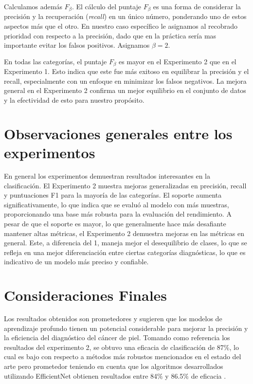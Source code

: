 Calculamos además $F_{\beta}$. El cálculo del puntaje $F_{\beta}$ es una forma de considerar la precisión y la recuperación (\textit{recall}) en un único número, ponderando uno de estos aspectos más que el otro. En nuestro caso específico le asignamos al recobrado prioridad con respecto a la precisión, dado que en la práctica sería mas importante evitar los falsos positivos. Asignamos $\beta = 2$.

En todas las categorías, el puntaje $F_{\beta}$ es mayor en el Experimento 2 que en el Experimento 1. Esto indica que este fue más exitoso en equilibrar la precisión y el recall, especialmente con un enfoque en minimizar los falsos negativos. La mejora general en el Experimento 2 confirma un mejor equilibrio en el conjunto de datos y la efectividad de esto para nuestro propósito.

\section*{Observaciones generales entre los experimentos}

En general los experimentos demuestran resultados interesantes en la clasificación. El Experimento 2 muestra mejoras generalizadas en precisión, recall y puntuaciones F1 para la mayoría de las categorías. El soporte aumenta significativamente, lo que indica que se evaluó al modelo con más muestras, proporcionando una base más robusta para la evaluación del rendimiento. A pesar de que el soporte es mayor, lo que generalmente hace más desafiante mantener altas métricas, el Experimento 2 demuestra mejoras en las métricas en general. Este, a diferencia del 1, maneja mejor el desequilibrio de clases, lo que se refleja en una mejor diferenciación entre ciertas categorías diagnósticas, lo que es indicativo de un modelo más preciso y confiable.

\section{Consideraciones Finales}\label{subsubsec:final_considerations}

Los resultados obtenidos son prometedores y sugieren que los modelos de aprendizaje profundo tienen un potencial considerable para mejorar la precisión y la eficiencia del diagnóstico del cáncer de piel. Tomando como referencia los resultados del experimento 2, se obtuvo una eficacia de clasificación de 87\%, lo cual es bajo con respecto a métodos más robustos mencionados en el estado del arte pero prometedor teniendo en cuenta que los algoritmos desarrollados utilizando EfficientNet obtienen resultados entre 84\% y 86.5\% de eficacia .

